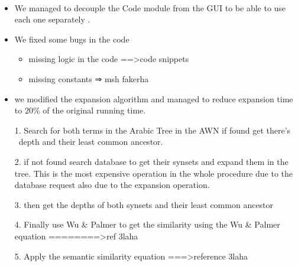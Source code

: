   
\begin{itemize}
\item We managed to decouple the Code module from the GUI to be able to use each one separately .
\item We fixed some bugs in the code 
\begin{itemize}
\item missing logic in the code ==>code snippets
\item missing constants ⇒ msh fakerha
\end{itemize}
\item we modified the expansion algorithm and managed to reduce expansion time to 20\% of the original running time.
\end{itemize}


\begin{itemize}
\item [1.] Search for both terms in the Arabic Tree in the AWN if found get there’s  depth and their least common ancestor.
\item [2.] if not found search database to get their synsets and expand them in the tree. This is the most expensive operation in the whole procedure due to the database request also due to the expansion operation.
\item [3.] then get the depths of both synsets and their least common ancestor 
\item [4.] Finally use Wu & Palmer to get the similarity using the Wu & Palmer equation ========>ref 3laha 
\item [5.] Apply the semantic similarity equation ===>reference 3laha 
\end{itemize}

